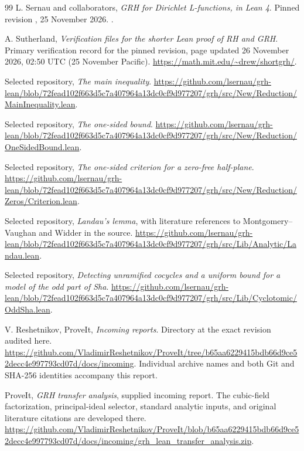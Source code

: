 \begin{thebibliography}{99}
\small
{}
L. Sernau and collaborators, \emph{GRH for Dirichlet L-functions, in Lean 4}.
Pinned revision , 25 November 2026.
\upstream.

A. Sutherland, \emph{Verification files for the shorter Lean proof of RH
and GRH}. Primary verification record for the pinned revision, page
updated 26 November 2026, 02:50 UTC (25 November Pacific).
\url{https://math.mit.edu/~drew/shortgrh/}.

Selected repository, \emph{The main inequality}.
\url{https://github.com/lsernau/grh-lean/blob/72fead102f663d5c7a407964a13dc0cf9d977207/grh/src/New/Reduction/MainInequality.lean}.

Selected repository, \emph{The one-sided bound}.
\url{https://github.com/lsernau/grh-lean/blob/72fead102f663d5c7a407964a13dc0cf9d977207/grh/src/New/Reduction/OneSidedBound.lean}.

Selected repository, \emph{The one-sided criterion for a zero-free half-plane}.
\url{https://github.com/lsernau/grh-lean/blob/72fead102f663d5c7a407964a13dc0cf9d977207/grh/src/New/Reduction/Zeros/Criterion.lean}.

Selected repository, \emph{Landau's lemma}, with literature references
to Montgomery--Vaughan and Widder in the source.
\url{https://github.com/lsernau/grh-lean/blob/72fead102f663d5c7a407964a13dc0cf9d977207/grh/src/Lib/Analytic/Landau.lean}.

Selected repository, \emph{Detecting unramified cocycles and a uniform
bound for a model of the odd part of Sha}.
\url{https://github.com/lsernau/grh-lean/blob/72fead102f663d5c7a407964a13dc0cf9d977207/grh/src/Lib/Cyclotomic/OddSha.lean}.

V. Reshetnikov, ProveIt, \emph{Incoming reports}.
Directory at the exact revision audited here.
\url{https://github.com/VladimirReshetnikov/ProveIt/tree/b65aa6229415bdb66d9ce52decc4e997793cd07d/docs/incoming}.
Individual archive names and both Git and SHA-256 identities accompany this report.

ProveIt, \emph{GRH transfer analysis}, supplied incoming report.
The cubic-field factorization, principal-ideal selector, standard analytic
inputs, and original literature citations are developed there.
\url{https://github.com/VladimirReshetnikov/ProveIt/blob/b65aa6229415bdb66d9ce52decc4e997793cd07d/docs/incoming/grh_lean_transfer_analysis.zip}.


\end{thebibliography}
